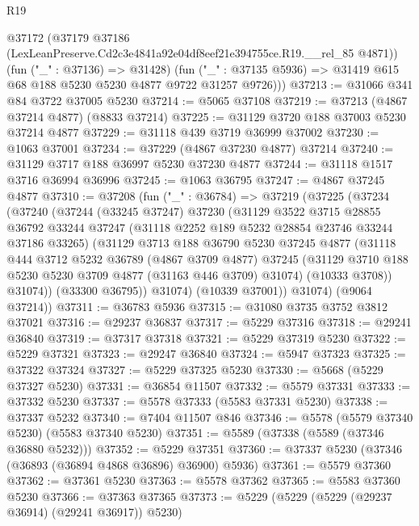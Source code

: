 \begin{lexlean}{R19}
\begin{coremodule}
      @37172
        (@37179 @37186 (LexLeanPreserve.Cd2c3e4841a92e04df8eef21e394755ce.R19.__rel_85 @4871))
        (fun ("_" : @37136) => @31428)
        (fun ("_" : @37135 @5936) => @31419 @615 @68 @188 @5230 @5230 @4877 @9722 @31257 @9726)))
@37213 := @31066 @341 @84 @3722 @37005 @5230
@37214 := @5065 @37108
@37219 := @37213 (@4867 @37214 @4877) (@8833 @37214)
@37225 := @31129 @3720 @188 @37003 @5230 @37214 @4877
@37229 := @31118 @439 @3719 @36999 @37002
@37230 := @1063 @37001
@37234 := @37229 (@4867 @37230 @4877) @37214
@37240 := @31129 @3717 @188 @36997 @5230 @37230 @4877
@37244 := @31118 @1517 @3716 @36994 @36996
@37245 := @1063 @36795
@37247 := @4867 @37245 @4877
@37310 := @37208
    (fun ("_" : @36784) =>
    @37219
      (@37225
        (@37234
          (@37240
            (@37244
              (@33245 @37247)
              @37230
              (@31129
                @3522
                @3715
                @28855
                @36792
                @33244
                @37247
                (@31118 @2252 @189 @5232 @28854 @23746 @33244 @37186 @33265)
                (@31129
                  @3713
                  @188
                  @36790
                  @5230
                  @37245
                  @4877
                  (@31118
                    @444
                    @3712
                    @5232
                    @36789
                    (@4867 @3709 @4877)
                    @37245
                    (@31129 @3710 @188 @5230 @5230 @3709 @4877 (@31163 @446 @3709) @31074)
                    (@10333 @3708))
                  @31074))
              (@33300 @36795))
            @31074)
          (@10339 @37001))
        @31074)
      (@9064 @37214))
@37311 := @36783 @5936
@37315 := @31080 @3735 @3752 @3812 @37021
@37316 := @29237 @36837
@37317 := @5229 @37316
@37318 := @29241 @36840
@37319 := @37317 @37318
@37321 := @5229 @37319 @5230
@37322 := @5229 @37321
@37323 := @29247 @36840
@37324 := @5947 @37323
@37325 := @37322 @37324
@37327 := @5229 @37325 @5230
@37330 := @5668 (@5229 @37327 @5230)
@37331 := @36854 @11507
@37332 := @5579 @37331
@37333 := @37332 @5230
@37337 := @5578 @37333 (@5583 @37331 @5230)
@37338 := @37337 @5232
@37340 := @7404 @11507 @846
@37346 := @5578 (@5579 @37340 @5230) (@5583 @37340 @5230)
@37351 := @5589 (@37338 (@5589 (@37346 @36880 @5232)))
@37352 := @5229 @37351
@37360 := @37337 @5230 (@37346 (@36893 (@36894 @4868 @36896) @36900) @5936)
@37361 := @5579 @37360
@37362 := @37361 @5230
@37363 := @5578 @37362
@37365 := @5583 @37360 @5230
@37366 := @37363 @37365
@37373 := @5229 (@5229 (@5229 (@29237 @36914) (@29241 @36917)) @5230)

\end{coremodule}
\end{lexlean}

